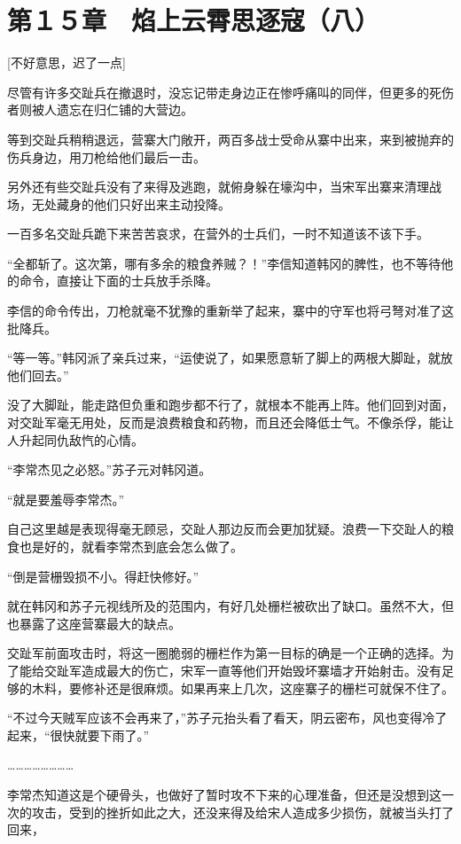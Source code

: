 \section{第１５章　焰上云霄思逐寇（八）}

[不好意思，迟了一点]

尽管有许多交趾兵在撤退时，没忘记带走身边正在惨呼痛叫的同伴，但更多的死伤者则被人遗忘在归仁铺的大营边。

等到交趾兵稍稍退远，营寨大门敞开，两百多战士受命从寨中出来，来到被抛弃的伤兵身边，用刀枪给他们最后一击。

另外还有些交趾兵没有了来得及逃跑，就俯身躲在壕沟中，当宋军出寨来清理战场，无处藏身的他们只好出来主动投降。

一百多名交趾兵跪下来苦苦哀求，在营外的士兵们，一时不知道该不该下手。

“全都斩了。这次第，哪有多余的粮食养贼？！”李信知道韩冈的脾性，也不等待他的命令，直接让下面的士兵放手杀降。

李信的命令传出，刀枪就毫不犹豫的重新举了起来，寨中的守军也将弓弩对准了这批降兵。

“等一等。”韩冈派了亲兵过来，“运使说了，如果愿意斩了脚上的两根大脚趾，就放他们回去。”

没了大脚趾，能走路但负重和跑步都不行了，就根本不能再上阵。他们回到对面，对交趾军毫无用处，反而是浪费粮食和药物，而且还会降低士气。不像杀俘，能让人升起同仇敌忾的心情。

“李常杰见之必怒。”苏子元对韩冈道。

“就是要羞辱李常杰。”

自己这里越是表现得毫无顾忌，交趾人那边反而会更加犹疑。浪费一下交趾人的粮食也是好的，就看李常杰到底会怎么做了。

“倒是营栅毁损不小。得赶快修好。”

就在韩冈和苏子元视线所及的范围内，有好几处栅栏被砍出了缺口。虽然不大，但也暴露了这座营寨最大的缺点。

交趾军前面攻击时，将这一圈脆弱的栅栏作为第一目标的确是一个正确的选择。为了能给交趾军造成最大的伤亡，宋军一直等他们开始毁坏寨墙才开始射击。没有足够的木料，要修补还是很麻烦。如果再来上几次，这座寨子的栅栏可就保不住了。

“不过今天贼军应该不会再来了，”苏子元抬头看了看天，阴云密布，风也变得冷了起来，“很快就要下雨了。”

……………………

李常杰知道这是个硬骨头，也做好了暂时攻不下来的心理准备，但还是没想到这一次的攻击，受到的挫折如此之大，还没来得及给宋人造成多少损伤，就被当头打了回来，

